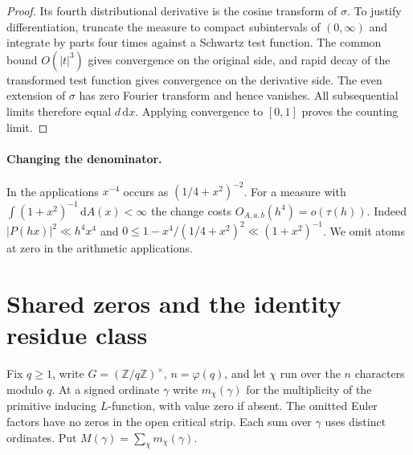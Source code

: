 \documentclass[11pt]{article}
\newcommand{\dd}{\,\mathrm d}
\begin{document}
\begin{proof}
Its fourth distributional derivative is the cosine transform of $\sigma$. To justify differentiation, truncate the measure to compact subintervals of $(0,\infty)$ and integrate by parts four times against a Schwartz test function. The common bound $O(|t|^3)$ gives convergence on the original side, and rapid decay of the transformed test function gives convergence on the derivative side. The even extension of $\sigma$ has zero Fourier transform and hence vanishes. All subsequential limits therefore equal $d\,\mathrm dx$. Applying convergence to $[0,1]$ proves the counting limit.
\end{proof}

\paragraph{Changing the denominator.}
In the applications $x^{-4}$ occurs as $(1/4+x^2)^{-2}$. For a measure with $\int(1+x^2)^{-1}\dd A(x)<\infty$ the change costs $O_{A,a,b}(h^4)=o(\tau(h))$. Indeed $|P(hx)|^2\ll h^4 x^4$ and $0\le 1-x^4/(1/4+x^2)^2\ll(1+x^2)^{-1}$. We omit atoms at zero in the arithmetic applications.

\section{Shared zeros and the identity residue class}
Fix $q\ge1$, write $G=(\mathbb Z/q\mathbb Z)^\times$, $n=\varphi(q)$, and let $\chi$ run over the $n$ characters modulo $q$. At a signed ordinate $\gamma$ write $m_\chi(\gamma)$ for the multiplicity of the primitive inducing $L$-function, with value zero if absent. The omitted Euler factors have no zeros in the open critical strip. Each sum over $\gamma$ uses distinct ordinates. Put $M(\gamma)=\sum_\chi m_\chi(\gamma)$.
\end{document}

